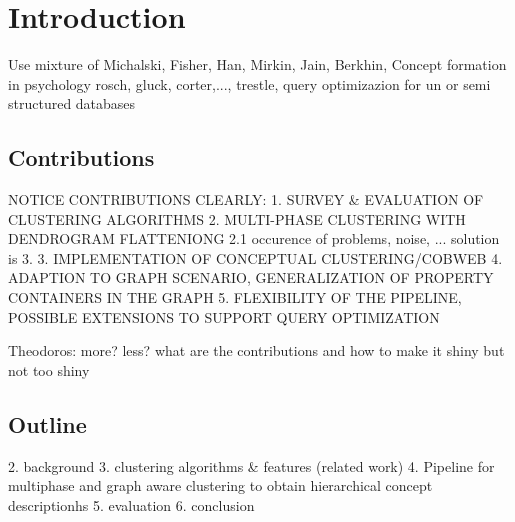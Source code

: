 \chapter{Introduction}
Use mixture of Michalski, Fisher, Han, Mirkin, Jain, Berkhin, Concept formation in psychology rosch, gluck, corter,..., trestle, query optimizazion for un or semi structured databases

\section{Contributions}
NOTICE CONTRIBUTIONS CLEARLY: 
1. SURVEY \& EVALUATION OF CLUSTERING ALGORITHMS
2. MULTI-PHASE CLUSTERING WITH DENDROGRAM FLATTENIONG
2.1 occurence of problems, noise, ... solution is 3.
3. IMPLEMENTATION OF CONCEPTUAL CLUSTERING/COBWEB
4. ADAPTION TO GRAPH SCENARIO, GENERALIZATION OF PROPERTY CONTAINERS IN THE GRAPH
5. FLEXIBILITY OF THE PIPELINE, POSSIBLE EXTENSIONS TO SUPPORT QUERY OPTIMIZATION 

Theodoros: more? less? what are the contributions and how to make it shiny but not too shiny
\section{Outline}
2. background
3. clustering algorithms \& features  (related work)
4. Pipeline for multiphase and graph aware clustering to obtain hierarchical concept descriptionhs
5. evaluation
6. conclusion